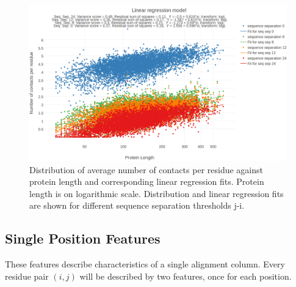 \documentclass[11pt,a4paper,twoside]{book}
\theoremstyle{definition}
\theoremstyle{definition}
\theoremstyle{remark}
\begin{document}
\begin{figure}

{\centering \includegraphics[width=0.9\linewidth]{img/random_forest_contact_prior/model_linreg_transformlogL_no_contacts_per_residue_vs_protein_length_thr8} 

}

\caption{Distribution of average number
of contacts per residue against protein length and corresponding linear
regression fits. Protein length is on logarithmic scale. Distribution
and linear regression fits are shown for different sequence separation
thresholds \textbar{}j-i\textbar{}.}\label{fig:simple-contact-prior-linfit}
\end{figure}

\subsection{Single Position Features}\label{seq-features-single}

These features describe characteristics of a single alignment column.
Every residue pair \((i,j)\) will be described by two features, once for
each position.
\end{document}
